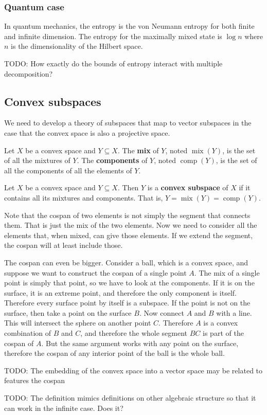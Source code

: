 \documentclass[11pt]{article}
\DeclareMathOperator{\mix}{mix}
\DeclareMathOperator{\component}{comp}
\begin{document}
\subsubsection{Quantum case}

In quantum mechanics, the entropy is the von Neumann entropy for both finite and infinite dimension. The entropy for the maximally mixed state is $\log n$ where $n$ is the dimensionality of the Hilbert space.

TODO: How exactly do the bounds of entropy interact with multiple decomposition?

\subsection{Convex subspaces}

We need to develop a theory of subspaces that map to vector subspaces in the case that the convex space is also a projective space.

\begin{defn}
	Let $X$ be a convex space and $Y \subseteq X$. The \textbf{mix} of $Y$, noted $\mix(Y)$, is the set of all the mixtures of $Y$. The \textbf{components} of $Y$, noted $\component(Y)$, is the set of all the components of all the elements of $Y$.
\end{defn}

\begin{defn}
	Let $X$ be a convex space and $Y \subseteq X$. Then $Y$ is a \textbf{convex subspace} of $X$ if it contains all its mixtures and components. That is, $Y = \mix(Y) = \component(Y)$.
\end{defn}

\begin{remark}
	Note that the cospan of two elements is not simply the segment that connects them. That is just the mix of the two elements. Now we need to consider all the elements that, when mixed, can give those elements. If we extend the segment, the cospan will at least include those.
	
	The cospan can even be bigger. Consider a ball, which is a convex space, and suppose we want to construct the cospan of a single point $A$. The mix of a single point is simply that point, so we have to look at the components. If it is on the surface, it is an extreme point, and therefore the only component is itself. Therefore every surface point by itself is a subspace. If the point is not on the surface, then take a point on the surface $B$. Now connect $A$ and $B$ with a line. This will intersect the sphere on another point $C$. Therefore $A$ is a convex combination of $B$ and $C$, and therefore the whole segment $BC$ is part of the cospan of $A$. But the same argument works with any point on the surface, therefore the cospan of any interior point of the ball is the whole ball. 
	
	TODO: The embedding of the convex space into a vector space may be related to features the cospan

	TODO: The definition mimics definitions on other algebraic structure so that it can work in the infinite case. Does it?
\end{remark}
\end{document}
